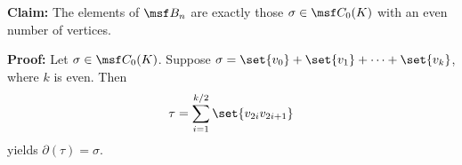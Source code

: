 \begin{solution}
\begin{enumerate}[label=(\roman*)]
\begin{enumerate}
          \textbf{Claim:} The elements of $\msf B_n$ are exactly those $\sigma
          \in \msf C_0(K)$ with an even number of vertices.

          \textbf{Proof:} Let $\sigma \in \msf C_0(K)$. Suppose $\sigma =
          \set{v_0} + \set{v_1} + \cdots + \set{v_k}$, where $k$ is even. Then
          \[
            \tau = \sum_{i=1}^{k/2} \set{v_{2i}v_{2i+1}}
          \]
          yields $\partial(\tau) = \sigma$.



      \end{enumerate}
  \end{enumerate}
\end{solution}
